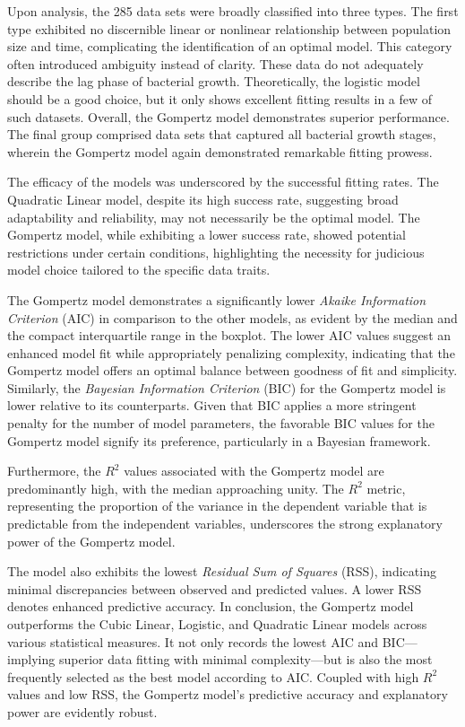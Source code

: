 \documentclass[11pt]{article}
\begin{document}
Upon analysis, the 285 data sets were broadly classified into three types. The first type exhibited no discernible linear or nonlinear relationship between population size and time, complicating the identification of an optimal model. This category often introduced ambiguity instead of clarity. These data do not adequately describe the lag phase of bacterial growth. Theoretically, the logistic model should be a good choice, but it only shows excellent fitting results in a few of such datasets. Overall, the Gompertz model demonstrates superior performance. The final group comprised data sets that captured all bacterial growth stages, wherein the Gompertz model again demonstrated remarkable fitting prowess.

The efficacy of the models was underscored by the successful fitting rates. The Quadratic Linear model, despite its high success rate, suggesting broad adaptability and reliability, may not necessarily be the optimal model. The Gompertz model, while exhibiting a lower success rate, showed potential restrictions under certain conditions, highlighting the necessity for judicious model choice tailored to the specific data traits.

The Gompertz model demonstrates a significantly lower \textit{Akaike Information Criterion} (AIC) in comparison to the other models, as evident by the median and the compact interquartile range in the boxplot. The lower AIC values suggest an enhanced model fit while appropriately penalizing complexity, indicating that the Gompertz model offers an optimal balance between goodness of fit and simplicity. Similarly, the \textit{Bayesian Information Criterion} (BIC) for the Gompertz model is lower relative to its counterparts. Given that BIC applies a more stringent penalty for the number of model parameters, the favorable BIC values for the Gompertz model signify its preference, particularly in a Bayesian framework.

Furthermore, the $R^2$ values associated with the Gompertz model are predominantly high, with the median approaching unity. The $R^2$ metric, representing the proportion of the variance in the dependent variable that is predictable from the independent variables, underscores the strong explanatory power of the Gompertz model.

The model also exhibits the lowest \textit{Residual Sum of Squares} (RSS), indicating minimal discrepancies between observed and predicted values. A lower RSS denotes enhanced predictive accuracy. In conclusion, the Gompertz model outperforms the Cubic Linear, Logistic, and Quadratic Linear models across various statistical measures. It not only records the lowest AIC and BIC—implying superior data fitting with minimal complexity—but is also the most frequently selected as the best model according to AIC. Coupled with high $R^2$ values and low RSS, the Gompertz model's predictive accuracy and explanatory power are evidently robust.
\end{document}
